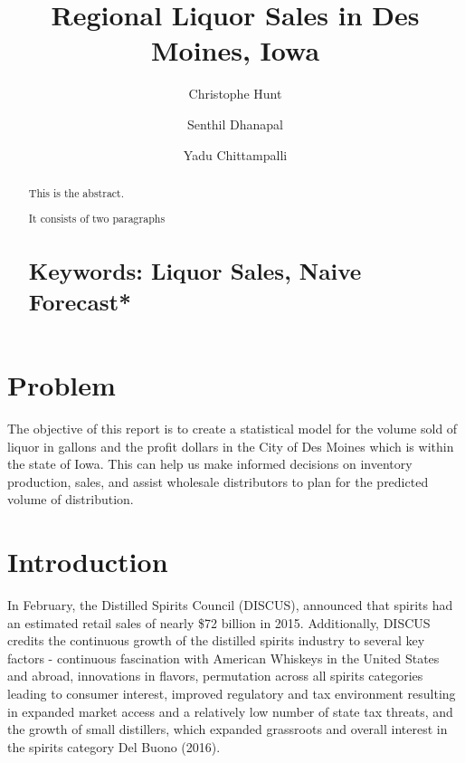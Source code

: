 \documentclass[]{elsarticle} %
\begin{document}
\begin{frontmatter}

  \title{Regional Liquor Sales in Des Moines, Iowa}
    \author[CUNY School of Professional Studies]{Christophe Hunt}
    \author[CUNY School of Professional Studies]{Senthil Dhanapal}
  
    \author[CUNY School of Professional Studies]{Yadu Chittampalli}
  
      \address[CUNY School of Professional Studies]{CUNY School of Professional Studies, Data Analytics, New York, NY}
  
  \begin{abstract}
  This is the abstract.
  
  It consists of two paragraphs
  
  \section{Keywords: Liquor Sales, Naive
  Forecast*}\label{keywords-liquor-sales-naive-forecast}
  \end{abstract}
  
 \end{frontmatter}

\section{Problem}\label{problem}

The objective of this report is to create a statistical model for the
volume sold of liquor in gallons and the profit dollars in the City of
Des Moines which is within the state of Iowa. This can help us make
informed decisions on inventory production, sales, and assist wholesale
distributors to plan for the predicted volume of distribution.

\section{Introduction}\label{introduction}

In February, the Distilled Spirits Council (DISCUS), announced that
spirits had an estimated retail sales of nearly \$72 billion in 2015.
Additionally, DISCUS credits the continuous growth of the distilled
spirits industry to several key factors - continuous fascination with
American Whiskeys in the United States and abroad, innovations in
flavors, permutation across all spirits categories leading to consumer
interest, improved regulatory and tax environment resulting in expanded
market access and a relatively low number of state tax threats, and the
growth of small distillers, which expanded grassroots and overall
interest in the spirits category Del Buono (2016).
\end{document}
